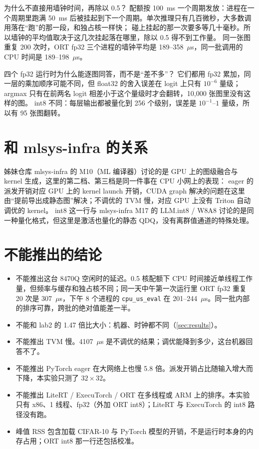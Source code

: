 \documentclass[11pt,a4paper]{ctexart}
\begin{document}
\begin{iqbox}{为什么不直接用墙钟时间，再除以 0.5？}
配额按 100~ms 一个周期发放：进程在一个周期里跑满 50~ms 后被挂起到下一个周期。单次推理只有几百微秒，大多数调用落在“跑”的那一段，和独占核一样快；
碰上挂起的那一次要多等几十毫秒。所以墙钟的平均值取决于这几次挂起落在哪里，除以 0.5 得不到工作量。
同一张图重复 200 次时，ORT fp32 三个进程的墙钟平均是 189--358~$\mu$s，同一批调用的 CPU 时间是 189--198~$\mu$s。
\end{iqbox}

\begin{iqbox}{四个 fp32 运行时为什么能逐图同答，而不是“差不多”？}
它们都用 fp32 累加，同一层的乘加顺序可能不同，但 float32 的舍入误差在 logit 上只有 $10^{-6}$ 量级；argmax 只有在前两名 logit 相差小于这个量级时才会翻转，10,000 张图里没有这样的图。
int8 不同：每层输出都被量化到 256 个级别，误差是 $10^{-1}$--$1$ 量级，所以有 95 张图翻转。
\end{iqbox}

\section{和 mlsys-infra 的关系}
姊妹仓库 mlsys-infra 的 M10（ML 编译器）讨论的是 GPU 上的图级融合与 kernel 生成，这里的第二档、第三档是同一件事在 CPU 小网上的表现：
eager 的派发开销对应 GPU 上的 kernel launch 开销，CUDA graph 解决的问题在这里由“提前导出成静态图”解决；不调优的 TVM 慢，对应 GPU 上没有 Triton 自动调优的 kernel。
int8 这一行与 mlsys-infra M17 的 LLM.int8 / W8A8 讨论的是同一种量化格式，但这里是激活也量化的静态 QDQ，没有离群值通道的特殊处理。

\section{不能推出的结论}\label{sec:caveat}

\begin{caveatbox}
\begin{itemize}
  \item 不能推出这台 8470Q 空闲时的延迟。0.5 核配额下 CPU 时间接近单线程工作量，但频率与缓存和独占核不同；同一天中午第一次运行里 ORT fp32 重复 20 次是 307~$\mu$s，下午 8 个进程的 \texttt{cpu\_us\_eval} 在 201--244~$\mu$s。同一批内部的排序可靠，跨批的绝对值能差一半。
  \item 不能和 lab2 的 1.47 倍比大小：机器、时钟都不同（\cref{sec:results}）。
  \item 不能推出 TVM 慢。4107~$\mu$s 是不调优的结果；调优能降到多少，这台机器回答不了。
  \item 不能推出 PyTorch eager 在大网络上也慢 5.8 倍。派发开销占比随输入增大而下降，本实验只测了 $32\times32$。
  \item 不能推出 LiteRT / ExecuTorch / ORT 在多线程或 ARM 上的排序。本实验只有 x86、1 线程、fp32（外加 ORT int8）；LiteRT 与 ExecuTorch 的 int8 路径没有跑。
  \item 峰值 RSS 包含加载 CIFAR-10 与 PyTorch 模型的开销，不是运行时本身的内存占用；ORT int8 那一行还包括校准。
\end{itemize}
\end{caveatbox}
\end{document}
